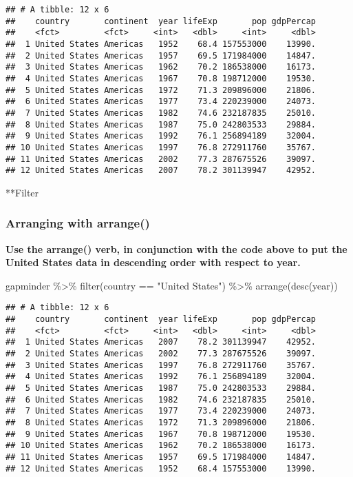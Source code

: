 \documentclass[
]{article}
\newenvironment{Shaded}{\begin{snugshade}}{\end{snugshade}}
\newcommand{\FunctionTok}[1]{\textcolor[rgb]{0.00,0.00,0.00}{#1}}
\newcommand{\NormalTok}[1]{#1}
\newcommand{\SpecialCharTok}[1]{\textcolor[rgb]{0.00,0.00,0.00}{#1}}
\newcommand{\StringTok}[1]{\textcolor[rgb]{0.31,0.60,0.02}{#1}}
\begin{document}
\begin{verbatim}
## # A tibble: 12 x 6
##    country       continent  year lifeExp       pop gdpPercap
##    <fct>         <fct>     <int>   <dbl>     <int>     <dbl>
##  1 United States Americas   1952    68.4 157553000    13990.
##  2 United States Americas   1957    69.5 171984000    14847.
##  3 United States Americas   1962    70.2 186538000    16173.
##  4 United States Americas   1967    70.8 198712000    19530.
##  5 United States Americas   1972    71.3 209896000    21806.
##  6 United States Americas   1977    73.4 220239000    24073.
##  7 United States Americas   1982    74.6 232187835    25010.
##  8 United States Americas   1987    75.0 242803533    29884.
##  9 United States Americas   1992    76.1 256894189    32004.
## 10 United States Americas   1997    76.8 272911760    35767.
## 11 United States Americas   2002    77.3 287675526    39097.
## 12 United States Americas   2007    78.2 301139947    42952.
\end{verbatim}

**Filter

\hypertarget{arranging-with-arrange}{%
\subsubsection{Arranging with arrange()}\label{arranging-with-arrange}}

\textbf{Use the arrange() verb, in conjunction with the code above to
put the United States data in descending order with respect to year.}

\begin{Shaded}
\begin{Highlighting}[]
\NormalTok{gapminder }\SpecialCharTok{\%\textgreater{}\%} \FunctionTok{filter}\NormalTok{(country }\SpecialCharTok{==} \StringTok{"United States"}\NormalTok{) }\SpecialCharTok{\%\textgreater{}\%} \FunctionTok{arrange}\NormalTok{(}\FunctionTok{desc}\NormalTok{(year))}
\end{Highlighting}
\end{Shaded}

\begin{verbatim}
## # A tibble: 12 x 6
##    country       continent  year lifeExp       pop gdpPercap
##    <fct>         <fct>     <int>   <dbl>     <int>     <dbl>
##  1 United States Americas   2007    78.2 301139947    42952.
##  2 United States Americas   2002    77.3 287675526    39097.
##  3 United States Americas   1997    76.8 272911760    35767.
##  4 United States Americas   1992    76.1 256894189    32004.
##  5 United States Americas   1987    75.0 242803533    29884.
##  6 United States Americas   1982    74.6 232187835    25010.
##  7 United States Americas   1977    73.4 220239000    24073.
##  8 United States Americas   1972    71.3 209896000    21806.
##  9 United States Americas   1967    70.8 198712000    19530.
## 10 United States Americas   1962    70.2 186538000    16173.
## 11 United States Americas   1957    69.5 171984000    14847.
## 12 United States Americas   1952    68.4 157553000    13990.
\end{verbatim}
\end{document}
